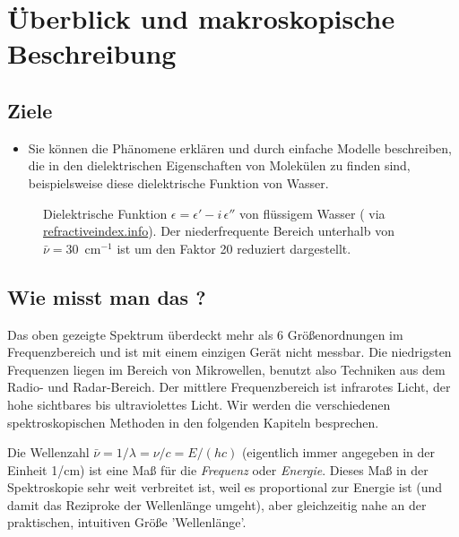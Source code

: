 
\chapter{Überblick und makroskopische Beschreibung}

\label{chap:3_diel}


\section{Ziele}

\begin{itemize}
\item Sie können die Phänomene erklären und durch einfache Modelle beschreiben, die in den  dielektrischen Eigenschaften von Molekülen zu finden sind, beispielsweise diese dielektrische Funktion von Wasser.

\end{itemize}

\begin{figure}
\caption{Dielektrische Funktion $\epsilon = \epsilon' - i \, \epsilon''$ von flüssigem Wasser (\cite{Segelstein_water} via 
\href{https://refractiveindex.info/?shelf=main&book=H2O&page=Segelstein}{refractiveindex.info}). Der niederfrequente Bereich unterhalb von $\bar{\nu} = 30$~cm$^{-1}$ ist um den Faktor 20 reduziert dargestellt.
\label{fig:diel_water}}

\end{figure}

\section{Wie misst man das ?}

Das oben gezeigte Spektrum überdeckt mehr als 6 Größenordnungen im Frequenzbereich und ist mit einem einzigen Gerät nicht  messbar. Die niedrigsten Frequenzen liegen im Bereich von Mikrowellen, benutzt also Techniken aus dem Radio- und Radar-Bereich. Der mittlere Frequenzbereich ist infrarotes Licht, der hohe sichtbares bis ultraviolettes Licht. Wir werden die verschiedenen spektroskopischen Methoden in den folgenden Kapiteln besprechen.


Die Wellenzahl $\bar{\nu} = 1 / \lambda =\nu / c =  E / (h c)$ (eigentlich immer angegeben in der Einheit 1/cm) ist eine Maß für die  \emph{Frequenz} oder \emph{Energie}. Dieses Maß in der Spektroskopie sehr weit verbreitet ist, weil es proportional zur Energie ist (und damit das Reziproke der Wellenlänge umgeht), aber gleichzeitig nahe an der praktischen, intuitiven Größe 'Wellenlänge'.

